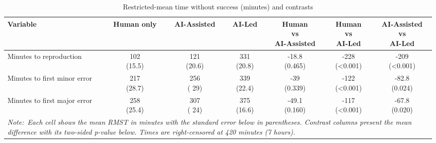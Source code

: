\begin{table}[ht]
\tiny
\centering
\caption{Restricted-mean time without success (minutes) and contrasts}
\label{tab:rmst}
\begin{tabular}{lcccccc}
  \hline\hline
Variable & Human only & AI-Assisted & AI-Led & \shortstack{Human\\vs\\AI-Assisted} & \shortstack{Human\\vs\\AI-Led} & \shortstack{AI-Assisted\\vs\\AI-Led} \\
  \hline\hline
Minutes to reproduction & \shortstack{ 102\\(15.5)} & \shortstack{ 121\\(20.6)} & \shortstack{ 331\\(20.8)} & \shortstack{-18.8\\(0.465)} & \shortstack{-228\\(<0.001)} & \shortstack{-209\\(<0.001)} \\
  Minutes to first minor error & \shortstack{ 217\\(28.7)} & \shortstack{ 256\\(  29)} & \shortstack{ 339\\(22.4)} & \shortstack{ -39\\(0.339)} & \shortstack{-122\\(<0.001)} & \shortstack{-82.8\\(0.024)} \\
  Minutes to first major error & \shortstack{ 258\\(25.4)} & \shortstack{ 307\\(  24)} & \shortstack{ 375\\(16.6)} & \shortstack{-49.1\\(0.160)} & \shortstack{-117\\(<0.001)} & \shortstack{-67.8\\(0.020)} \\
   \hline\hline
\multicolumn{7}{p{0.6\textwidth}}{\it Note:~Each cell shows the mean RMST in minutes with the standard error below in parentheses. Contrast columns present the mean difference with its two-sided \emph{p}-value below. Times are right-censored at 420 minutes (7 hours).}
\end{tabular}
\end{table}
